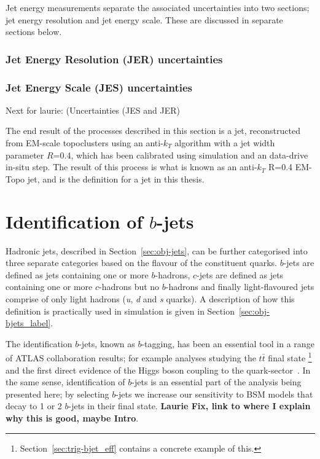 Jet energy measurements separate the associated uncertainties into two sections;
jet energy resolution and jet energy scale.
These are discussed in separate sections below.

\subsubsection{Jet Energy Resolution (JER) uncertainties}
\subsubsection{Jet Energy Scale (JES) uncertainties}

Next for laurie: (Uncertainties (JES and JER)


The end result of the processes described in this section is a jet,
reconstructed from EM-scale topoclusters using an anti-$k_T$ algorithm with a jet width parameter $R$=0.4,
which has been calibrated using simulation and an data-drive in-situ step.
The result of this process is what is known as an anti-$k_T$ R=0.4 EM-Topo jet,
and is the definition for a jet in this thesis.


\newpage
\section{Identification of $b$-jets}
\label{sec:obj-bjets}

Hadronic jets, described in Section~\ref{sec:obj-jets}, can be further categorised into three separate categories based on the flavour of the constituent quarks.
$b$-jets are defined as jets containing one or more $b$-hadrons,
$c$-jets are defined as jets containing one or more $c$-hadrons but no $b$-hadrons
and finally light-flavoured jets comprise of only light hadrons (\textit{u}, \textit{d} and \textit{s} quarks).
A description of how this definition is practically used in simulation is given in Section~\ref{sec:obj-bjets_label}.

The identification $b$-jets, known as $b$-tagging, has been an essential tool in a range of ATLAS collaboration results;
for example analyses studying the $t\bar{t}$ final state \cite{obj-ttbar} \footnote{Section~\ref{sec:trig-bjet_eff} contains a concrete example of this.}
and the first direct evidence of the Higgs boson coupling to the quark-sector~\cite{obj-Hbb}.
In the same sense, identification of $b$-jets is an essential part of the analysis being presented here;
by selecting $b$-jets we increase our sensitivity to BSM models that decay to 1 or 2 $b$-jets in their final state.
\textbf{Laurie Fix, link to where I explain why this is good, maybe Intro}.

